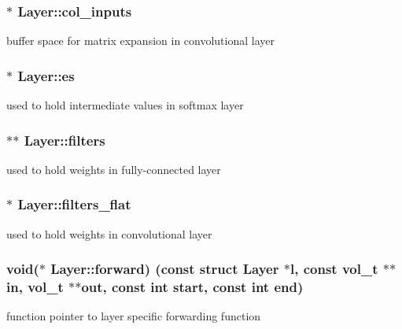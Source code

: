 \subsubsection[{col\+\_\+inputs}]{$\ast$ Layer\+::col\+\_\+inputs}\hypertarget{structLayer_a7f3d8c93228c92633f65e22878aed50e}{}\label{structLayer_a7f3d8c93228c92633f65e22878aed50e}
buffer space for matrix expansion in convolutional layer 
\subsubsection[{es}]{$\ast$ Layer\+::es}\hypertarget{structLayer_aa22466959721de60fac4e0ba73a5f5e1}{}\label{structLayer_aa22466959721de60fac4e0ba73a5f5e1}
used to hold intermediate values in softmax layer 
\subsubsection[{filters}]{$\ast$$\ast$ Layer\+::filters}\hypertarget{structLayer_aa92f4f42e91e5a9e2fcf8370095e8b5a}{}\label{structLayer_aa92f4f42e91e5a9e2fcf8370095e8b5a}
used to hold weights in fully-\/connected layer 
\subsubsection[{filters\+\_\+flat}]{$\ast$ Layer\+::filters\+\_\+flat}\hypertarget{structLayer_ad33732c7bae16b97250b1a235a801937}{}\label{structLayer_ad33732c7bae16b97250b1a235a801937}
used to hold weights in convolutional layer 
\subsubsection[{forward}]{\setlength{\rightskip}{0pt plus 5cm}void($\ast$ Layer\+::forward) (const struct {\bf Layer} $\ast$l, const {\bf vol\+\_\+t} $\ast$$\ast${\bf in}, {\bf vol\+\_\+t} $\ast$$\ast${\bf out}, const int {\bf start}, const int {\bf end})}\hypertarget{structLayer_aec5e26e4dd832a4434d0285802024fc1}{}\label{structLayer_aec5e26e4dd832a4434d0285802024fc1}
function pointer to layer specific forwarding function 
